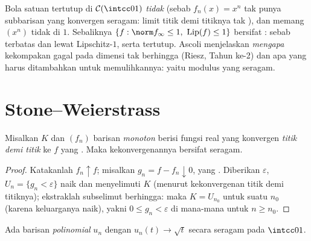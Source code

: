 \begin{example}\label{ex:b3:complete:ascoliexamples}
Bola satuan tertutup di $\mathcal C(\intcc01)$ \emph{tidak}
 (sebab $f_n(x) = x^n$ tak punya subbarisan yang konvergen
seragam: limit titik demi titiknya tak ), dan memang
$(x^n)$ tidak  di $1$. Sebaliknya $\{f : \norm
f_\infty \leq 1,\ \operatorname{Lip}(f) \leq 1\}$ bersifat :
sebab terbatas dan  lewat Lipschitz-$1$, serta tertutup. Ascoli
menjelaskan \emph{mengapa} kekompakan gagal pada dimensi tak berhingga
(Riesz, Tahun ke-2) dan apa yang harus ditambahkan untuk memulihkannya: yaitu
modulus  yang seragam.
\end{example}

\section{Stone--Weierstrass}

\begin{lemma}[Dini]\label{lem:b3:complete:dini}
Misalkan $K$  dan $(f_n)$ barisan \emph{monoton} berisi
fungsi real  yang konvergen \emph{titik demi titik} ke
$f$ yang . Maka kekonvergenannya bersifat
seragam.
\end{lemma}

\begin{proof}
Katakanlah $f_n \uparrow f$; misalkan $g_n = f - f_n \downarrow 0$,
yang . Diberikan $\varepsilon$,  $U_n = \{g_n <
\varepsilon\}$ naik dan menyelimuti $K$ (menurut kekonvergenan titik demi titiknya);
ekstraklah subselimut berhingga: maka $K = U_{n_0}$ untuk suatu $n_0$
(karena keluarganya naik), yakni $0 \leq g_n < \varepsilon$
di mana-mana untuk $n \geq n_0$.
\end{proof}

\begin{lemma}\label{lem:b3:complete:sqrt}
Ada barisan \emph{polinomial} $u_n$ dengan $u_n(t) \to
\sqrt t$ secara seragam pada $\intcc01$.
\end{lemma}

